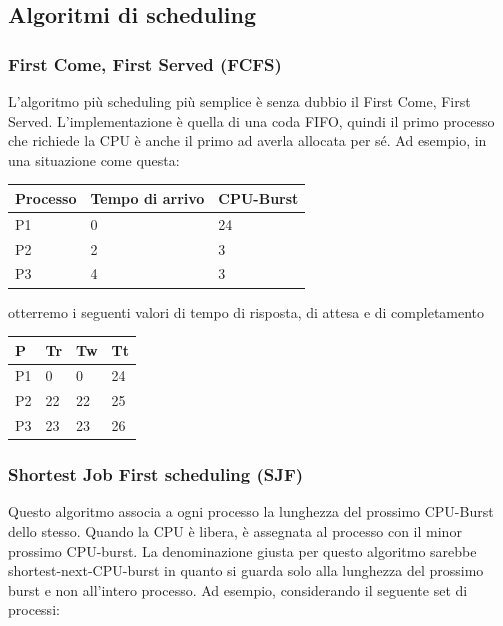 \documentclass[a4paper]{article}
\begin{document}
\subsection{Algoritmi di scheduling}

\subsubsection{First Come, First Served (FCFS)}
L'algoritmo più scheduling più semplice è senza dubbio il First Come, First Served. L'implementazione è quella di una coda FIFO, quindi il primo processo che richiede la CPU è anche il primo ad averla allocata per sé.\newline
Ad esempio, in una situazione come questa:

\begin{table}[htb]
   \centering
   \label{my-label}
   \begin{tabular}{lll}
      Processo & Tempo di arrivo & CPU-Burst \\ \hline
      P1       & 0               & 24        \\
      P2       & 2               & 3         \\
      P3       & 4               & 3
   \end{tabular}
\end{table}

otterremo i seguenti valori di tempo di risposta, di attesa e di completamento

\begin{table}[htb]
   \centering
   \label{my-label}
   \begin{tabular}{llll}
      P  & Tr & Tw & Tt \\ \hline
      P1 & 0  & 0  & 24 \\
      P2 & 22 & 22 & 25 \\
      P3 & 23 & 23 & 26
   \end{tabular}
\end{table}

\subsubsection{Shortest Job First scheduling (SJF)}
Questo algoritmo associa a ogni processo la lunghezza del prossimo CPU-Burst dello stesso. Quando la CPU è libera, è assegnata al processo con il minor prossimo CPU-burst. La denominazione giusta per questo algoritmo sarebbe shortest-next-CPU-burst in quanto si guarda solo alla lunghezza del prossimo burst e non all'intero processo. \newline
Ad esempio, considerando il seguente set di processi:
\end{document}
